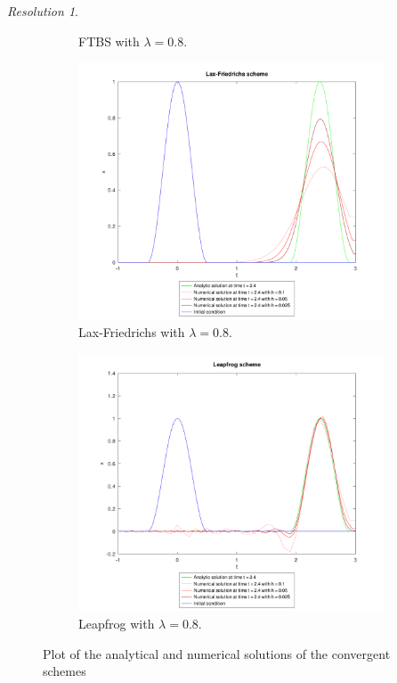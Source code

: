 \documentclass[10pt,a4paper]{article}
\theoremstyle{definition}
\theoremstyle{remark}
\newtheorem*{res}{Resolution}
\begin{document}
\begin{res}
\begin{figure}[ht]
\begin{subfigure}{0.49\textwidth}
      \caption{FTBS with $\lambda=0.8$.}
    \end{subfigure}\hfill
    \begin{subfigure}{0.49\textwidth}
      \centering
      \includegraphics[width=\textwidth]{Images/lf.pdf}
      \caption{Lax-Friedrichs with $\lambda=0.8$.}
    \end{subfigure}\hfill
    \begin{subfigure}{0.49\textwidth}
      \centering
      \includegraphics[width=\textwidth]{Images/l.pdf}
      \caption{Leapfrog with $\lambda=0.8$.}
    \end{subfigure}
    \caption{Plot of the analytical and numerical solutions of the convergent schemes}
  \end{figure}
\end{res}
\end{document}
